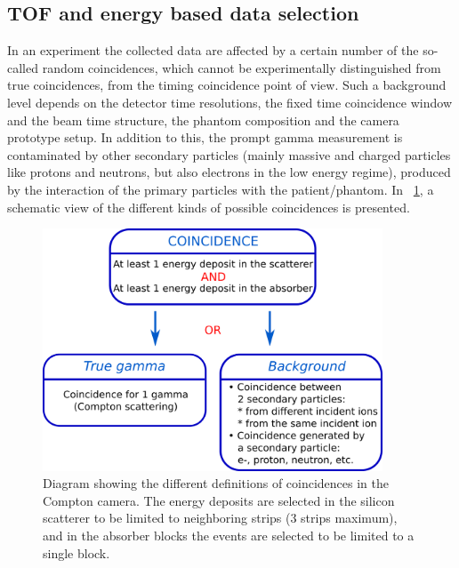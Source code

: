 \subsection{TOF and energy based data selection}\label{chap4::subsec::MatMeth::TOF_Ecut}

In an experiment the collected data are affected by a certain number of the so-called random coincidences, which cannot be experimentally distinguished from true coincidences, from the timing coincidence point of view. Such a background level depends on the detector time resolutions, the fixed time coincidence window and the beam time structure, the phantom composition and the camera prototype setup.
In addition to this, the prompt gamma measurement is contaminated by other secondary particles (mainly massive and charged particles like protons and neutrons, but also electrons in the low energy regime), produced by the interaction of the primary particles with the patient/phantom. In \figurename~\ref{chap4::fig::coincidence_CC_simulation_Hadronth}, a schematic view of the different kinds of possible coincidences is presented.

\begin{figure}
  \centering
  \includegraphics[width=0.9\textwidth]{03_GraphicFiles/chapter4_HTsimu/coinc_scheme.png}
  \caption{Diagram showing the different definitions of coincidences in the Compton camera. The energy deposits are selected in the silicon scatterer to be limited to neighboring strips (3 strips maximum), and in the absorber blocks the events are selected to be limited to a single block.}
 \label{chap4::fig::coincidence_CC_simulation_Hadronth}
\end{figure}

